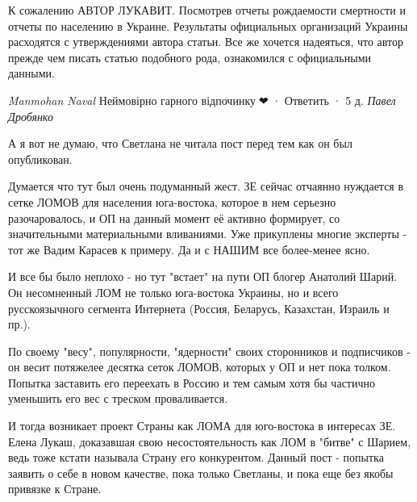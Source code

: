 \begin{itemize}
К сожалению АВТОР ЛУКАВИТ. Посмотрев отчеты рождаемости смертности и отчеты по
населению в Украине. Результаты официальных организаций Украины расходятся с
утверждениями автора статьи. Все же хочется надеяться, что автор прежде чем
писать статью подобного рода, ознакомился с официальными данными.

\emph{Manmohan Naval}
Неймовірно гарного відпочинку🌈❤
 · Ответить · 5 д.
\emph{Павел Дробянко}

А я вот не думаю, что Светлана не читала пост перед тем как он был опубликован.

Думается что тут был очень подуманный жест. ЗЕ сейчас отчаянно нуждается в
сетке ЛОМОВ для населения юга-востока, которое в нем серьезно разочаровалось, и
ОП на данный момент её активно формирует, со значительными материальными
вливаниями. Уже прикуплены многие эксперты - тот же Вадим Карасев к примеру. Да
и с НАШИМ все более-менее ясно. 

И все бы было неплохо - но тут "встает" на пути ОП блогер Анатолий Шарий. Он
несомненный ЛОМ не только юга-востока Украины, но и всего русскоязычного
сегмента Интернета (Россия, Беларусь, Казахстан, Израиль и пр.). 

По своему "весу", популярности, "ядерности" своих сторонников и подписчиков -
он весит потяжелее десятка сеток ЛОМОВ, которых у ОП и нет пока толком. Попытка
заставить его переехать в Россию и тем самым хотя бы частично уменьшить его вес
с треском проваливается. 

И тогда возникает проект Страны как ЛОМА для юго-востока в интересах ЗЕ. Елена
Лукаш, доказавшая свою несостоятельность как ЛОМ в "битве" с Шарием, ведь тоже
кстати называла Страну его конкурентом. Данный пост - попытка заявить о себе в
новом качестве, пока только Светланы, и пока еще без якобы привязке к Стране.

\end{itemize}


